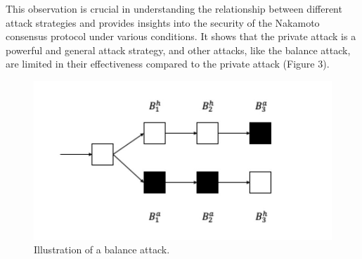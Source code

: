 \documentclass{report}
\begin{document}
This observation is crucial in understanding the relationship between different attack strategies and provides insights into the security of the Nakamoto consensus protocol under various conditions. It shows that the private attack is a powerful and general attack strategy, and other attacks, like the balance attack, are limited in their effectiveness compared to the private attack (Figure 3). 
\begin{figure}[h!]
	\centering
	\includegraphics[width=0.6\linewidth]{Fig/F3}
	\caption{Illustration of a balance attack.}
	\label{fig:f1}
\end{figure}
\end{document}
